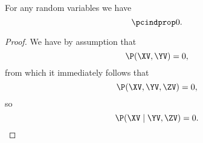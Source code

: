 \begin{proposition}
  For any random variables 
  \listrv
  we have
  $$\pcindprop0.$$%
\end{proposition}

\begin{proof}
  We have by assumption that
  $$\P(\XV, \YV) = 0,$$
  from which it immediately follows that
  $$\P(\XV, \YV, \ZV) = 0,$$
  so
  $$\P(\XV \mid \YV, \ZV) = 0.$$%
\end{proof}
